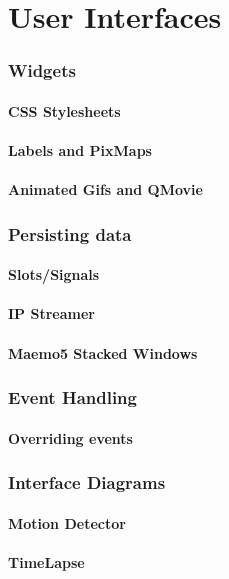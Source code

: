 \documentclass[11pt]{article} %
\begin{document}
\part{User Interfaces}
\section{Widgets}
\subsection{CSS Stylesheets}
\subsection{Labels and PixMaps}
\subsection{Animated Gifs and QMovie}
\section{Persisting data}

\subsection{Slots/Signals}
\subsection{IP Streamer}
\subsection{Maemo5 Stacked Windows}

\section{Event Handling}
\subsection{Overriding events}
\section{Interface Diagrams}
\subsection{Motion Detector}
\subsection{TimeLapse}
\end{document}
